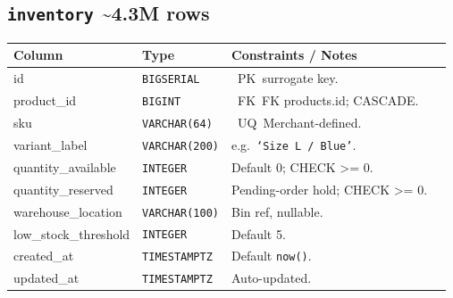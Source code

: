 \documentclass[8pt,a4paper]{extarticle}
\newcommand{\pkbadge}{\textcolor{primary}{\faKey}~PK}
\newcommand{\fkbadge}{\textcolor{secondary}{\faKey}~FK}
\newcommand{\uqbadge}{\textcolor{accent}{\faPen}~UQ}
\newcommand{\tttype}[1]{\texttt{#1}}
\newcommand{\tableheader}[2]{\subsection{\texttt{#1} \textcolor{accent}{\textbar{} #2}}}
\begin{document}
\tableheader{inventory}{\textasciitilde{}4.3M rows}
\begin{tcolorbox}[schemaframe]
  \renewcommand{\arraystretch}{1.05}
  \begin{tabularx}{\linewidth}{p{2cm} p{1.6cm} X p{2cm}}
    \toprule
    \rowcolor{primary!10}\textbf{Column} & \textbf{Type} & \textbf{Constraints / Notes} \\
    \midrule
    id                  & \tttype{BIGSERIAL}   & \pkbadge\ surrogate key. \\
    product\_id         & \tttype{BIGINT}      & \fkbadge\ FK \textrightarrow{} products.id; CASCADE. \\
    sku                 & \tttype{VARCHAR(64)} & \uqbadge\ Merchant-defined. \\
    variant\_label      & \tttype{VARCHAR(200)}& e.g.\ \texttt{`Size~L~/~Blue'}. \\
    quantity\_available & \tttype{INTEGER}     & Default 0; CHECK >= 0. \\
    quantity\_reserved  & \tttype{INTEGER}     & Pending-order hold; CHECK >= 0. \\
    warehouse\_location & \tttype{VARCHAR(100)}& Bin ref, nullable. \\
    low\_stock\_threshold& \tttype{INTEGER}    & Default 5. \\
    created\_at         & \tttype{TIMESTAMPTZ} & Default \texttt{now()}. \\
    updated\_at         & \tttype{TIMESTAMPTZ} & Auto-updated. \\
    \bottomrule
  \end{tabularx}
\end{tcolorbox}
\end{document}

